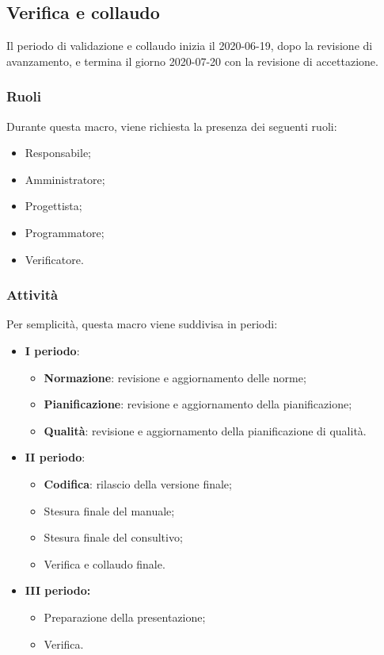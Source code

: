 \documentclass[../piano-di-progetto.tex]{subfiles}
\begin{document}
\subsection{Verifica e collaudo}
Il periodo di validazione e collaudo inizia il 2020-06-19, dopo la revisione di avanzamento, e termina il giorno 2020-07-20 con la revisione di accettazione. 

\subsubsection{Ruoli}
Durante questa macro, viene richiesta la presenza dei seguenti ruoli:
\begin{itemize}
    \item Responsabile;
    \item Amministratore;
    \item Progettista;
    \item Programmatore;
    \item Verificatore.
\end{itemize}

\subsubsection{Attività}
Per semplicità, questa macro viene suddivisa in periodi:

\begin{itemize}
    \item \textbf{I periodo}:
        \begin{itemize}
            \item \textbf{Normazione}: revisione e aggiornamento delle norme;
            \item \textbf{Pianificazione}: revisione e aggiornamento della pianificazione;
            \item \textbf{Qualità}: revisione e aggiornamento della pianificazione di qualità.
        \end{itemize}
    \item \textbf{II periodo}:
        \begin{itemize}
            \item \textbf{Codifica}: rilascio della versione finale;
            \item Stesura finale del manuale;
            \item Stesura finale del consultivo;
            \item Verifica e collaudo finale.
        \end{itemize}
    \item \textbf{III periodo:}
        \begin{itemize}
            \item Preparazione della presentazione;
            \item Verifica.
        \end{itemize}
\end{itemize}
\end{document}
